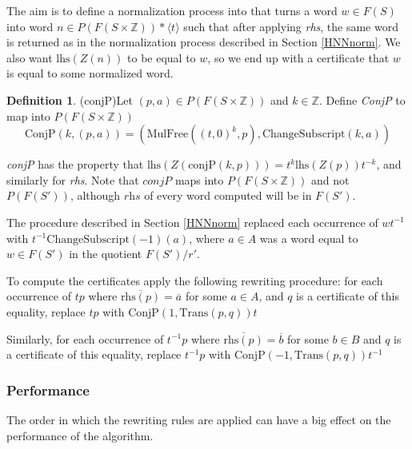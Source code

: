 \documentclass[11pt]{article} %
\theoremstyle{definition}
\theoremstyle{definition}
\theoremstyle{definition}
\theoremstyle{definition}
\theoremstyle{definition}
\newtheorem{defn}[theorem]{Definition}
\theoremstyle{definition}
\begin{document}
The aim is to define a normalization process into that turns a word $w \in F(S)$ into
word $n \in P(F(S \times \mathbb{Z})) \ast \langle t \rangle$
such that after applying \textit{rhs}, the same word is returned as in the
normalization process described in Section \ref{HNNnorm}. We also want
$\text{lhs}(Z(n))$ to be equal to $w$, so we end up with a certificate that $w$
is equal to some normalized word.

\begin{defn}(conjP)\label{conjP}
  Let $(p, a) \in P(F(S \times \mathbb{Z}))$ and $k \in \mathbb{Z}$.
  Define \textit{ConjP} to map into $P(F(S \times \mathbb{Z}))$
  \begin{equation}
    \text{ConjP}(k, (p, a)) = (\text{MulFree}((t,0)^k, p), \text{ChangeSubscript}(k, a))
  \end{equation}
\end{defn}

\textit{conjP} has the property that
$\text{lhs}(Z(\text{conjP}(k, p))) = t^k \text{lhs}(Z(p))t^{-k}$,
and similarly for \textit{rhs}. Note that $\textit{conjP}$ maps into $P(F(S \times \mathbb{Z}))$
and not $P(F(S'))$, although $\textit{rhs}$ of every word computed
will be in $F(S')$.

The procedure described in Section \ref{HNNnorm}
replaced each occurrence of $wt^{-1}$ with \newline $t^{-1}\text{ChangeSubscript}(-1)(a)$,
where $a \in A$ was a word equal to $w \in F(S')$ in the quotient $F(S') / r'$.

To compute the certificates apply the following rewriting procedure:
for each occurrence of $tp$ where $\overline{\text{rhs}(p)} = \overline{a}$ for
some $a \in A$, and $q$ is a certificate of this equality,
replace $tp$ with $\text{ConjP}(1, \text{Trans}(p, q))t$

Similarly, for each occurrence of $t^{-1}p$ where $\overline{\text{rhs}(p)} = \overline{b}$ for
some $b \in B$ and $q$ is a certificate of this equality,
replace $t^{-1}p$ with $\text{ConjP}(-1, \text{Trans}(p, q))t^{-1}$

\subsubsection{Performance}

The order in which the rewriting rules are applied can have a big effect on the performance
of the algorithm.
\end{document}
